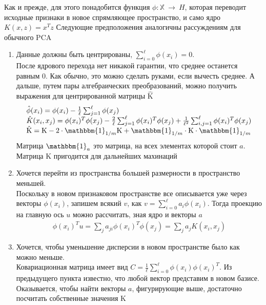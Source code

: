 \documentclass[12pt,fleqn]{article}
\begin{document}
Как и прежде, для этого понадобится функция $\phi: \mathbb{X}~\to~H$, которая переводит исходные признаки в новое спрямляющее пространство, и само ядро $K(x, z) = x^Tz$ Следующие предположения аналогичны рассуждениям для обычного PCA 

\begin{enumerate}
\item Данные должны быть центрированы, $\sum_{i=0}^\ell \phi(x_i) = 0$. \\ После ядрового перехода нет никакой гарантии, что среднее останется равным 0. Как обычно, это можно сделать руками, если вычесть среднее. А дальше, путем пары алгебраических преобразований, можно получить выражения для центрированной матрицы $\hat{\text{K}}$
\begin{equation}
  \begin{array}{l}
    \hat{\phi}(x_i) = \phi(x_i) - \frac{1}{\ell}\sum_{j=1}^\ell\phi(x_j) \\
    \hat{K}(x_i, x_j) = \phi(x_i)^T\phi(x_j) - \frac{2}{\ell}\sum_{j=1}^\ell\phi(x_i)^T\phi(x_j) + \frac{1}{\ell^2}\sum_{i, j=1}^\ell\phi(x_i)^T\phi(x_j) \\
    \hat{\text{K}} = \text{K} - 2\cdot\mathbbm{1}_{1/m} \text{K} + \mathbbm{1}_{1/m} \cdot \text{K} \cdot \mathbbm{1}_{1/m}
  \end{array}
\end{equation}
Матрица $\mathbbm{1}_{a}$ это матрица, на всех элементах которой стоит $a$. Матрица $\text{K}$ пригодится для дальнейших махинаций

\break

\item Хочется перейти из пространства большей размерности в пространство меньшей. \\ Поскольку в новом признаковом пространстве все описывается уже через векторы $\phi(x_i)$, запишем всякий $v$, как $v=\sum_{i=0}^\ell a_i \phi(x_i) $. Тогда проекцию на главную ось $u$ можно рассчитать, зная ядро и векторы $a$
\begin{equation}
  \begin{array}{l}
    \phi(x_i)^T u = \sum_j a_{ji} \phi(x_i)^T \phi(x_j) = \sum_j a_j K(x_i, x_j)
  \end{array}
\end{equation}

\item Хочется, чтобы уменьшение дисперсии в новом пространстве было как можно меньше. \\ 
Ковариационная матрица имеет вид $C = \frac{1}{\ell}\sum_{i=0}^\ell \phi(x_i) \phi(x_i)^T$. Из предыдущего пункта известно, что любой вектор представим в новом базисе. Оказывается, чтобы найти векторы $a$, фигурирующие выше, достаточно посчитать собственные значения $\text{K}$


\end{enumerate}
\end{document}
